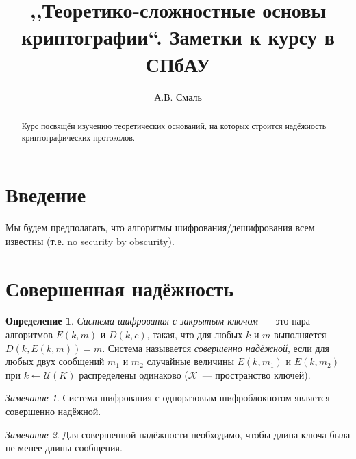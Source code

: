 \documentclass[12pt]{article}
\title{,,Теоретико-сложностные основы криптографии``. Заметки к курсу в СПбАУ}
\author{А.В. Смаль}
\theoremstyle{definition}
\newtheorem{definition}{Определение}[section]
\theoremstyle{plain}
\theoremstyle{remark}
\newtheorem{remark}{Замечание}[section]
\begin{document}
\maketitle

\begin{abstract}
Курс посвящён изучению теоретических оснований, на которых строится
надёжность криптографических протоколов.
\end{abstract}

\tableofcontents
\newpage


\section*{Введение}
Мы будем предполагать, что алгоритмы шифрования/дешифрования всем известны (т.е. no security by obscurity).

\section{Совершенная надёжность}
\begin{definition}
\emph{Система шифрования с закрытым ключом}~--- это пара
алгоритмов $E(k, m)$ и $D(k, c)$, такая, что
для любых $k$ и $m$ выполняется $D(k, E(k, m)) = m$. Система называется \emph{совершенно надёжной}, если для любых двух сообщений $m_1$ и $m_2$ случайные величины $E(k, m_1)$ и $E(k, m_2)$ при $k\gets \mathcal U(K)$ распределены одинаково ($\mathcal K$~--- пространство ключей).
\end{definition}
\begin{remark}
Система шифрования с одноразовым шифроблокнотом является совершенно надёжной.
\end{remark}

\begin{remark}
Для совершенной надёжности необходимо, чтобы длина ключа была не менее длины сообщения.
\end{remark}
\end{document}
